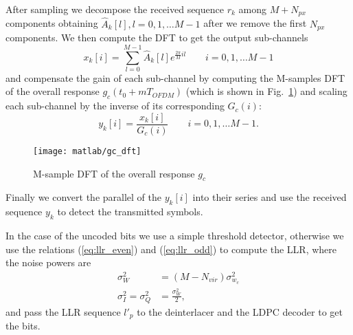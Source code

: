 \documentclass[a4paper,oneside]{article}
\begin{document}
After sampling we decompose the received sequence $r_k$ among $M+N_{px}$ components obtaining $\hat{A}_k[l], l = 0,1,\dots M-1$ after we remove the first $N_{px}$ components. We then compute the DFT to get the output sub-channels
\begin{equation}
  x_k[i] = \sum_{l=0}^{M-1}\hat{A}_k[l]e^{\frac{2\pi}{M}il} \qquad i=0,1,\dots M-1
\end{equation}
and compensate the gain of each sub-channel by computing the M-samples
DFT of the overall response $g_c(t_0 + mT_{OFDM})$ (which is shown in
Fig.~\ref{plot:gc_dft}) and scaling each sub-channel by the inverse of
its corresponding $G_c(i)$:
\begin{equation}
  y_k[i] = \frac{x_k[i]}{G_c(i)} \qquad i=0,1,\dots M-1 .
\end{equation}
\begin{figure}[htbp]
  \centering
  \texttt{[image: matlab/gc\_dft]}
  \caption{M-sample DFT of the overall response $g_c$}
  \label{plot:gc_dft}
\end{figure}

Finally we convert the parallel of the $y_k[i]$ into their series and use the received sequence $y_k$ to detect the transmitted symbols.

In the case of the uncoded bits we use a simple threshold detector,
otherwise we use the relations (\ref{eq:llr_even}) and
(\ref{eq:llr_odd}) to compute the LLR, where the noise powers are
\begin{align}
  \sigma_W^2 &= (M-N_{vir})\sigma^2_{w_c} \\
  \sigma^2_I = \sigma^2_Q &= \frac{\sigma_W^2}{2} ,
\end{align}
and pass the LLR sequence $l'_p$ to the deinterlacer and the LDPC
decoder to get the bits.
\end{document}
